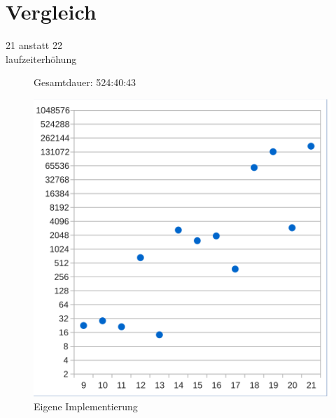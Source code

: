 \section{Vergleich}

21 anstatt 22\\
laufzeiterhöhung


\begin{figure}[!h]
  \centering
  \begin{minipage}[t]{0.45\textwidth}
  \begin{flushleft}Gesamtdauer: 524:40:43\end{flushleft}
  \includegraphics[scale=0.55]{images/eval_thesis}
  \end{minipage}
  \caption{Eigene Implementierung}
  \label{fig:eval_thesis}
\end{figure}

